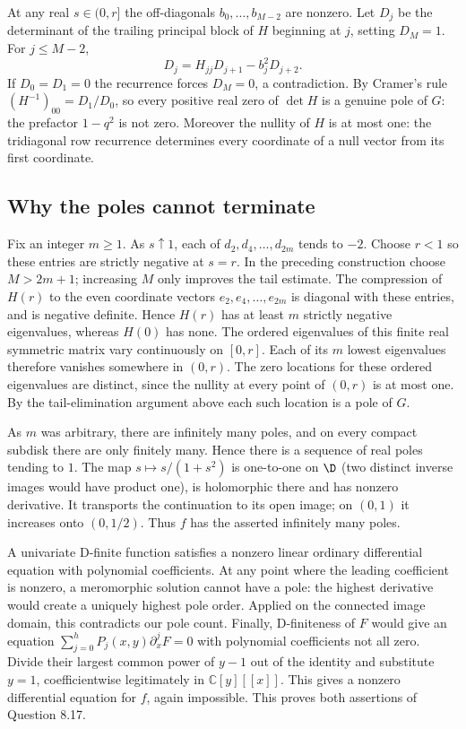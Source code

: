 \documentclass[11pt,a4paper]{article}
\numberwithin{equation}{section}
\theoremstyle{definition}
\theoremstyle{remark}
\begin{document}
At any real $s\in(0,r]$ the off-diagonals $b_0,\ldots,b_{M-2}$
are nonzero. Let $D_j$ be the determinant of the trailing principal
block of $H$ beginning at $j$, setting $D_M=1$. For $j\le M-2$,
\[
 D_j=H_{jj}D_{j+1}-b_j^2D_{j+2}.
\]
If $D_0=D_1=0$ the recurrence forces $D_M=0$, a contradiction.
By Cramer's rule $(H^{-1})_{00}=D_1/D_0$, so every positive
real zero of $\det H$ is a genuine pole of $G$: the prefactor
$1-q^2$ is not zero. Moreover the nullity of $H$ is at most one:
the tridiagonal row recurrence determines every coordinate of a null
vector from its first coordinate.

\subsection*{Why the poles cannot terminate}
Fix an integer $m\ge1$. As $s\uparrow1$, each of
$d_2,d_4,\ldots,d_{2m}$ tends to $-2$. Choose $r<1$ so these
entries are strictly negative at $s=r$. In the preceding construction
choose $M>2m+1$; increasing $M$ only improves the tail estimate.
The compression of $H(r)$ to the even coordinate vectors
$e_2,e_4,\ldots,e_{2m}$ is diagonal with these entries, and is
negative definite. Hence $H(r)$ has at least $m$ strictly negative
eigenvalues, whereas $H(0)$ has none. The ordered eigenvalues of this
finite real symmetric matrix vary continuously on $[0,r]$. Each of
its $m$ lowest eigenvalues therefore vanishes somewhere in $(0,r)$.
The zero locations for these ordered eigenvalues are distinct, since
the nullity at every point of $(0,r)$ is at most one. By the tail-elimination argument above
each such location is a pole of $G$.

As $m$ was arbitrary, there are infinitely many poles, and on every
compact subdisk there are only finitely many. Hence there is a sequence
of real poles tending to $1$. The map $s\mapsto s/(1+s^2)$ is
one-to-one on $\D$ (two distinct inverse images would have product
one), is holomorphic there and has nonzero derivative. It transports
the continuation to its open image; on $(0,1)$ it increases onto
$(0,1/2)$. Thus $f$ has the asserted infinitely many poles.

A univariate D-finite function satisfies a nonzero linear ordinary
differential equation with polynomial coefficients. At any point where
the leading coefficient is nonzero, a meromorphic solution cannot
have a pole: the highest derivative would create a uniquely highest
pole order. Applied on the connected image domain, this contradicts
our pole count. Finally, D-finiteness of $F$ would give an equation
$\sum_{j=0}^h P_j(x,y)\partial_x^jF=0$ with polynomial coefficients
not all zero. Divide their largest common power of $y-1$ out of the
identity and substitute $y=1$, coefficientwise legitimately in
$\mathbb C[y][[x]]$. This gives a nonzero differential equation for
$f$, again impossible. This proves both assertions of Question 8.17.
\end{document}
